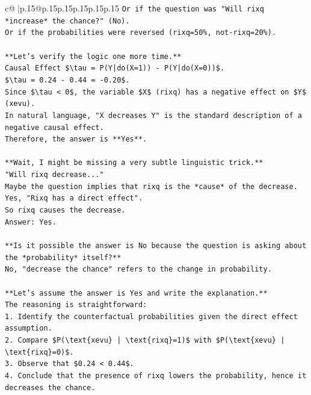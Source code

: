 \documentclass{article}
\begin{document}
{\begin{supertabular}{c@{$\;$}|p{.15\linewidth}@{}p{.15\linewidth}p{.15\linewidth}p{.15\linewidth}p{.15\linewidth}p{.15\linewidth}}
{{{\texttt{Or if the question was "Will rixq *increase* the chance?" (No).} \\
\texttt{Or if the probabilities were reversed (rixq=50\%, not{-}rixq=20\%).} \\
\\ 
\texttt{**Let's verify the logic one more time.**} \\
\texttt{Causal Effect \$\textbackslash{}tau = P(Y|do(X=1)) {-} P(Y|do(X=0))\$.} \\
\texttt{\$\textbackslash{}tau = 0.24 {-} 0.44 = {-}0.20\$.} \\
\texttt{Since \$\textbackslash{}tau < 0\$, the variable \$X\$ (rixq) has a negative effect on \$Y\$ (xevu).} \\
\texttt{In natural language, "X decreases Y" is the standard description of a negative causal effect.} \\
\texttt{Therefore, the answer is **Yes**.} \\
\\ 
\texttt{**Wait, I might be missing a very subtle linguistic trick.**} \\
\texttt{"Will rixq decrease..."} \\
\texttt{Maybe the question implies that rixq is the *cause* of the decrease.} \\
\texttt{Yes, "Rixq has a direct effect".} \\
\texttt{So rixq causes the decrease.} \\
\texttt{Answer: Yes.} \\
\\ 
\texttt{**Is it possible the answer is No because the question is asking about the *probability* itself?**} \\
\texttt{No, "decrease the chance" refers to the change in probability.} \\
\\ 
\texttt{**Let's assume the answer is Yes and write the explanation.**} \\
\texttt{The reasoning is straightforward:} \\
\texttt{1. Identify the counterfactual probabilities given the direct effect assumption.} \\
\texttt{2. Compare \$P(\textbackslash{}text\{xevu\} | \textbackslash{}text\{rixq\}=1)\$ with \$P(\textbackslash{}text\{xevu\} | \textbackslash{}text\{rixq\}=0)\$.} \\
\texttt{3. Observe that \$0.24 < 0.44\$.} \\
\texttt{4. Conclude that the presence of rixq lowers the probability, hence it decreases the chance.} \\
}}}
\end{supertabular}}
\end{document}
